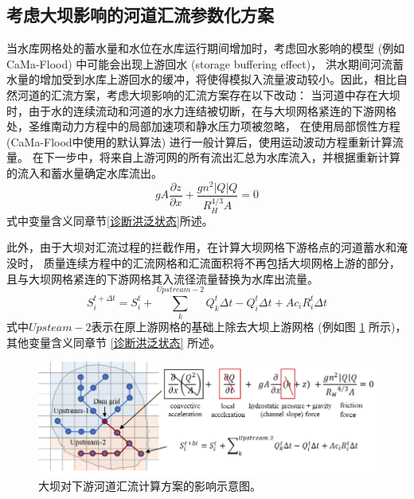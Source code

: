\subsection{考虑大坝影响的河道汇流参数化方案}
当水库网格处的蓄水量和水位在水库运行期间增加时，考虑回水影响的模型 (例如CaMa-Flood) 中可能会出现上游回水 (storage buffering effect)，
洪水期间河流蓄水量的增加受到水库上游回水的缓冲，将使得模拟入流量波动较小。因此，相比自然河道的汇流方案，考虑大坝影响的汇流方案存在以下改动：
当河道中存在大坝时，由于水的连续流动和河道的水力连结被切断，在与大坝网格紧连的下游网格处，圣维南动力方程中的局部加速项和静水压力项被忽略，
在使用局部惯性方程 (CaMa-Flood中使用的默认算法) 进行一般计算后，使用运动波动方程重新计算流量。
在下一步中，将来自上游河网的所有流出汇总为水库流入，并根据重新计算的流入和蓄水量确定水库流出。
\begin{equation}
g A \frac{\partial z}{\partial x}+\frac{g n^{2}|Q| Q}{R_{H}^{4 / 3} A}=0
\end{equation}
式中变量含义同章节\ref{诊断洪泛状态}所述。


此外，由于大坝对汇流过程的拦截作用，在计算大坝网格下游格点的河道蓄水和淹没时，
质量连续方程中的汇流网格和汇流面积将不再包括大坝网格上游的部分，
且与大坝网格紧连的下游网格其入流径流量替换为水库出流量。
\begin{equation}
S_{i}^{t+\Delta t}=S_{i}^{t}+\sum_{k}^{Upstream-2} Q_{k}^{t} \Delta t-Q_{i}^{t} \Delta t+A c_{i} R_{i}^{t} \Delta t
\end{equation}
式中$Upsteam-2$表示在原上游网格的基础上除去大坝上游网格 (例如图 \ref{fig:大坝对下游河道汇流计算方案的影响示意图} 所示)，其他变量含义同章节 \ref{诊断洪泛状态} 所述。

{
\begin{figure}[]
\centering
\includegraphics{Figures/陆地表面的水分循环/大坝对下游河道汇流计算方案的影响示意图.png}
\caption{大坝对下游河道汇流计算方案的影响示意图。}
\label{fig:大坝对下游河道汇流计算方案的影响示意图}
\end{figure}
}